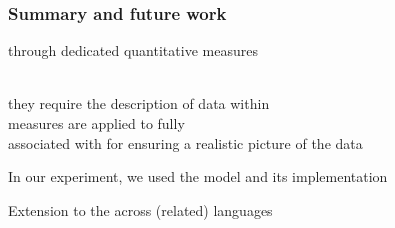 
\begin{frame}
\frametitle{Summary and future work}
\footnotesize
\begin{wideitemize}\footnotesize
\item[\highlightii{\lefthand}]   through dedicated quantitative measures
\item[\highlightii{\lefthand}] 
\item[\highlightiv{\danger}] \\
\ra they require the description of data within \\
\ra measures are applied to fully \\
\ra associated with  for ensuring a
realistic picture of the data
\begin{smallwideitemize}\footnotesize
\item In our experiment, we used the \parsli model \cite{walther13phd} and its \alexinaparsli
implementation \cite{sagot13sfcm}
\end{smallwideitemize}
\item[\highlighti{\noway}] 
\end{wideitemize}
{}
\begin{wideitemize}\footnotesize
\item[\highlightii{\leafNE}] Extension to the  across (related) languages 
\end{wideitemize}
\end{frame}




